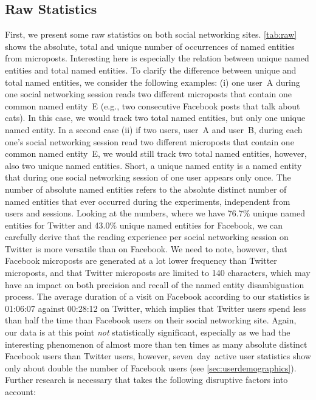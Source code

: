 \documentclass{iosart2c}
\begin{document}
\subsection{Raw Statistics}
First, we present some raw statistics on both social networking sites.
\autoref{tab:raw} shows the absolute, total and unique number of occurrences of named entities from microposts.
Interesting here is especially the relation between unique named entities and total named entities.
To clarify the difference between unique and total named entities, we consider the following examples:
(i) one user~A during one social networking session reads two different microposts that contain one common named entity~E (e.g., two consecutive Facebook posts that talk about cats).
In this case, we would track two total named entities, but only one unique named entity.
In a second case (ii) if two users, user~A and user~B, during each one's social networking session read two different microposts that contain one common named entity~E, we would still track two total named entities, however, also two unique named entities.
Short, a unique named entity is a named entity that during one social networking session of one user appears only once.
The number of absolute named entities refers to the absolute distinct number of named entities that ever occurred during the experiments, independent from users and sessions.
Looking at the numbers, where we have 76.7\% unique named entities for Twitter and 43.0\% unique named entities for Facebook, we can carefully derive that the reading experience per social networking session on Twitter is more versatile than on Facebook.
We need to note, however, that Facebook microposts are generated at a lot lower frequency than Twitter microposts, and that Twitter microposts are limited to 140 characters, which may have an impact on both precision and recall of the named entity disambiguation process.
The average duration of a visit on Facebook according to our statistics is 01:06:07 against 00:28:12 on Twitter, which implies that Twitter users spend less than half the time than Facebook users on their social networking site.
Again, our data is at this point \emph{not} statistically significant, especially as we had the interesting phenomenon of almost more than ten times as many absolute distinct Facebook users than Twitter users, however, seven~day~active user statistics show only about double the number of Facebook users (see \autoref{sec:userdemographics}).
Further research is necessary that takes the following disruptive factors into account:
\end{document}
